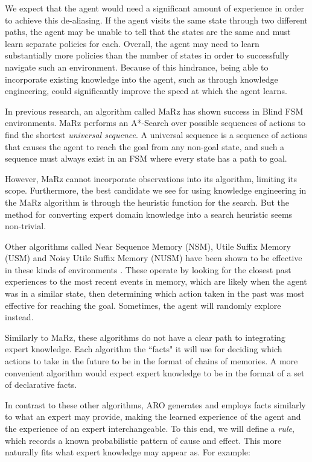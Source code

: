 \documentclass[letterpaper]{article} %
\begin{document}
We expect that the agent would need a significant amount of experience
in order to achieve this de-aliasing. If the agent visits the same
state through two different paths, the agent may be unable to tell
that the states are the same and must learn separate policies for
each. Overall, the agent may need to learn substantially more policies
than the number of states in order to successfully navigate such an
environment. Because of this hindrance, being able to incorporate
existing knowledge into the agent, such as through knowledge
engineering, could significantly improve the speed at which the agent
learns.

In previous research, an algorithm called MaRz \cite{Rodriguez17} has
shown success in Blind FSM environments.  MaRz performs an
A*-Search \cite{Russell09} over possible sequences of actions to find
the shortest \textit{universal sequence}.  A universal sequence is a
sequence of actions that causes the agent to reach the goal from any
non-goal state, and such a sequence must always exist in an FSM where every state has a path to goal.

However, MaRz cannot incorporate observations into its algorithm,
limiting its scope. Furthermore, the best candidate we see for using
knowledge engineering in the MaRz algorithm is through the heuristic
function for the search. But the method for converting expert domain
knowledge into a search heuristic seems non-trivial.

Other algorithms called Near Sequence Memory (NSM), Utile Suffix
Memory (USM) and Noisy Utile Suffix Memory (NUSM) have been shown to
be effective in these kinds of
environments \cite{McCallumNSM95,McCallumUSM95,Shani2005}. These
operate by looking for the closest past experiences to the most recent
events in memory, which are likely when the agent was in a similar
state, then determining which action taken in the past was most
effective for reaching the goal.  Sometimes, the agent will randomly
explore instead.

Similarly to MaRz, these algorithms do not have a clear path to
integrating expert knowledge. Each algorithm the ``facts" it will use
for deciding which actions to take in the future to be in the format
of chains of memories.  A more convenient algorithm would expect
expert knowledge to be in the format of a set of declarative facts.

In contrast to these other algorithms, ARO generates and employs facts
similarly to what an expert may provide, making the learned experience
of the agent and the experience of an expert interchangeable. To this
end, we will define a \textit{rule}, which records a known
probabilistic pattern of cause and effect. This more naturally fits
what expert knowledge may appear as. For example:
\end{document}
